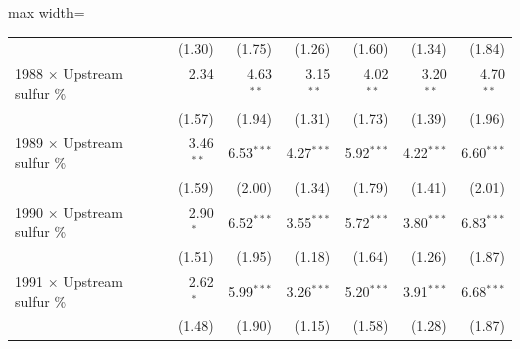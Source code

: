 \begin{table}[htbp]
{\begin{adjustbox}{max width=\linewidth}
\begin{tabular}{lrrrrrr}
 & (\phantom{-}1.30)\phantom{$^{***}$} & (\phantom{-}1.75)\phantom{$^{***}$} & (\phantom{-}1.26)\phantom{$^{***}$} & (\phantom{-}1.60)\phantom{$^{***}$} & (\phantom{-}1.34)\phantom{$^{***}$} & (\phantom{-}1.84)\phantom{$^{***}$} \\
1988 $\times$ Upstream sulfur \% & \phantom{(}\phantom{-}2.34$^{\phantom{*}\phantom{*}\phantom{*}}$ & \phantom{(}\phantom{-}4.63$^{**\phantom{*}}$ & \phantom{(}\phantom{-}3.15$^{**\phantom{*}}$ & \phantom{(}\phantom{-}4.02$^{**\phantom{*}}$ & \phantom{(}\phantom{-}3.20$^{**\phantom{*}}$ & \phantom{(}\phantom{-}4.70$^{**\phantom{*}}$ \\
 & (\phantom{-}1.57)\phantom{$^{***}$} & (\phantom{-}1.94)\phantom{$^{***}$} & (\phantom{-}1.31)\phantom{$^{***}$} & (\phantom{-}1.73)\phantom{$^{***}$} & (\phantom{-}1.39)\phantom{$^{***}$} & (\phantom{-}1.96)\phantom{$^{***}$} \\
1989 $\times$ Upstream sulfur \% & \phantom{(}\phantom{-}3.46$^{**\phantom{*}}$ & \phantom{(}\phantom{-}6.53$^{***}$ & \phantom{(}\phantom{-}4.27$^{***}$ & \phantom{(}\phantom{-}5.92$^{***}$ & \phantom{(}\phantom{-}4.22$^{***}$ & \phantom{(}\phantom{-}6.60$^{***}$ \\
 & (\phantom{-}1.59)\phantom{$^{***}$} & (\phantom{-}2.00)\phantom{$^{***}$} & (\phantom{-}1.34)\phantom{$^{***}$} & (\phantom{-}1.79)\phantom{$^{***}$} & (\phantom{-}1.41)\phantom{$^{***}$} & (\phantom{-}2.01)\phantom{$^{***}$} \\
1990 $\times$ Upstream sulfur \% & \phantom{(}\phantom{-}2.90$^{*\phantom{*}\phantom{*}}$ & \phantom{(}\phantom{-}6.52$^{***}$ & \phantom{(}\phantom{-}3.55$^{***}$ & \phantom{(}\phantom{-}5.72$^{***}$ & \phantom{(}\phantom{-}3.80$^{***}$ & \phantom{(}\phantom{-}6.83$^{***}$ \\
 & (\phantom{-}1.51)\phantom{$^{***}$} & (\phantom{-}1.95)\phantom{$^{***}$} & (\phantom{-}1.18)\phantom{$^{***}$} & (\phantom{-}1.64)\phantom{$^{***}$} & (\phantom{-}1.26)\phantom{$^{***}$} & (\phantom{-}1.87)\phantom{$^{***}$} \\
1991 $\times$ Upstream sulfur \% & \phantom{(}\phantom{-}2.62$^{*\phantom{*}\phantom{*}}$ & \phantom{(}\phantom{-}5.99$^{***}$ & \phantom{(}\phantom{-}3.26$^{***}$ & \phantom{(}\phantom{-}5.20$^{***}$ & \phantom{(}\phantom{-}3.91$^{***}$ & \phantom{(}\phantom{-}6.68$^{***}$ \\
 & (\phantom{-}1.48)\phantom{$^{***}$} & (\phantom{-}1.90)\phantom{$^{***}$} & (\phantom{-}1.15)\phantom{$^{***}$} & (\phantom{-}1.58)\phantom{$^{***}$} & (\phantom{-}1.28)\phantom{$^{***}$} & (\phantom{-}1.87)\phantom{$^{***}$} \\

\end{tabular}
\end{adjustbox}}
\end{table}
